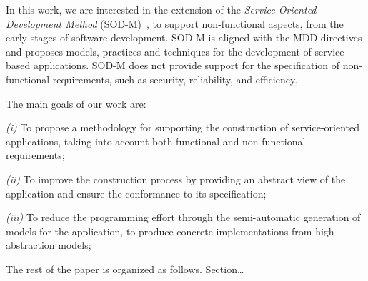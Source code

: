 In this work, we are interested in the extension of the \textit{Service Oriented Development Method} (SOD-M)~\cite{decastro1}, to support non-functional aspects, from the early stages of software development.
SOD-M is aligned with the MDD directives and proposes models, practices and techniques for the development of service-based applications.
SOD-M does not provide support for the specification of non-functional requirements, such as
security, reliability, and efficiency. 

The main goals of our work are:
\begin{trivlist}
\item \textit{(i)} To propose a methodology for supporting the construction of service-oriented applications, taking into account both functional and non-functional requirements;
\item \textit{(ii)} To improve the construction process by providing an abstract view of the application and ensure the conformance to its specification;
\item \textit{(iii)} To reduce the programming effort through the semi-automatic generation of  models for the application, to produce concrete implementations from high abstraction models;
\end{trivlist}

The rest of the paper is organized as follows. 
Section\dots

